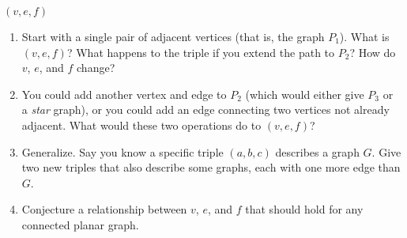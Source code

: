 \documentclass{book}
\begin{document}
\setcounter{cpjt}{21}
\addtocounter{cpjt}{-1}
\begin{activity}\label{activity-16}
\((v,e,f)\)\begin{enumerate}[font=\bfseries,label=(\alph*),ref=\alph*]
\item\label{task-20} \hypertarget{p-213}{}%
Start with a single pair of adjacent vertices (that is, the graph \(P_1\)).  What is \((v,e,f)\)?  What happens to the triple if you extend the path to \(P_2\)?  How do \(v\), \(e\), and \(f\) change?%
\item\label{task-21} \hypertarget{p-214}{}%
You could add another vertex and edge to \(P_2\) (which would either give \(P_3\) or a \emph{star} graph), or you could add an edge connecting two vertices not already adjacent.  What would these two operations do to \((v,e,f)\)?%
\item\label{task-22} \hypertarget{p-215}{}%
Generalize.  Say you know a specific triple \((a,b,c)\) describes a graph \(G\).  Give two new triples that also describe some graphs, each with one more edge than \(G\).%
\item\label{task-23} \hypertarget{p-216}{}%
Conjecture a relationship between \(v\), \(e\), and \(f\) that should hold for any connected planar graph.%
\end{enumerate}
\end{activity}

\clearpage
\end{document}
